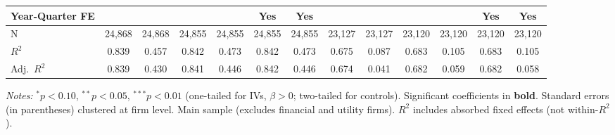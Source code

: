 \begin{landscape}
\begin{table}[H]
\begin{tabular}{lcccccccccccc}
Year-Quarter FE &  &  &  &  & Yes & Yes &  &  &  &  & Yes & Yes \\
\midrule
N & 24,868 & 24,868 & 24,855 & 24,855 & 24,855 & 24,855 & 23,127 & 23,127 & 23,120 & 23,120 & 23,120 & 23,120 \\
$R^2$ & 0.839 & 0.457 & 0.842 & 0.473 & 0.842 & 0.473 & 0.675 & 0.087 & 0.683 & 0.105 & 0.683 & 0.105 \\
Adj.~$R^2$ & 0.839 & 0.430 & 0.841 & 0.446 & 0.842 & 0.446 & 0.674 & 0.041 & 0.682 & 0.059 & 0.682 & 0.058 \\
\bottomrule
\end{tabular}
\begin{minipage}{\linewidth}
\vspace{2pt}\scriptsize
\textit{Notes:} $^{*}p<0.10$, $^{**}p<0.05$, $^{***}p<0.01$ (one-tailed for IVs, $\beta > 0$; two-tailed for controls).
 Significant coefficients in \textbf{bold}.
 Standard errors (in parentheses) clustered at firm level.
 Main sample (excludes financial and utility firms).
 $R^2$ includes absorbed fixed effects (not within-$R^2$).
\end{minipage}
\end{table}
\end{landscape}